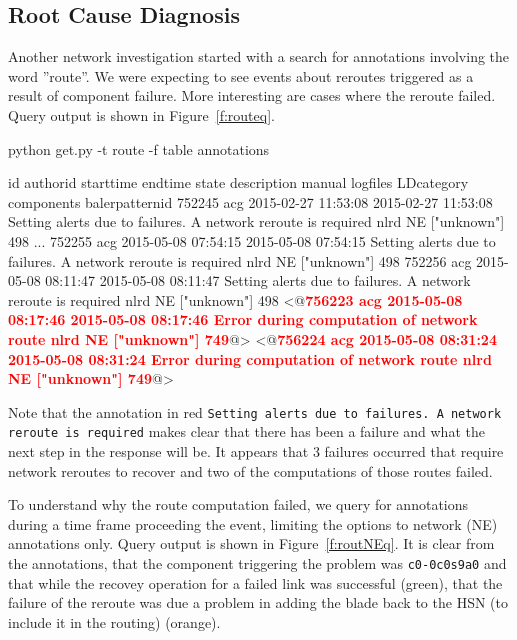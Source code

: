 \subsection{Root Cause Diagnosis}
\label{s:route}
Another network investigation started with a search for annotations involving the word ''route''.
We were expecting to see events about reroutes triggered as a result of component failure. More interesting
are cases where the reroute failed. Query output is shown in Figure~\ref{f:routeq}.

\begin{figure*}
\begin{annol}
python get.py -t route -f table annotations

id	authorid	starttime	endtime	state	description	manual	logfiles LDcategory	components	balerpatternid
752245	acg	2015-02-27 11:53:08	2015-02-27 11:53:08	Setting alerts due to failures. A network reroute is required	nlrd	NE	["unknown"]	498
...
752255	acg	2015-05-08 07:54:15	2015-05-08 07:54:15	Setting alerts due to failures. A network reroute is required	nlrd	NE	["unknown"]	498
752256	acg	2015-05-08 08:11:47	2015-05-08 08:11:47	Setting alerts due to failures. A network reroute is required	nlrd	NE	["unknown"]	498
<@\textbf{\textcolor{red}{756223	acg	2015-05-08 08:17:46	2015-05-08 08:17:46	Error during computation of network route    nlrd	NE	["unknown"]	749}}@>
<@\textbf{\textcolor{red}{756224	acg	2015-05-08 08:31:24	2015-05-08 08:31:24	Error during computation of network route    nlrd	NE	["unknown"]	749}}@>
\end{annol}
\caption{Output of query for route annotations. Complete output = 15 annotations}
\label{f:routeq}
\end{figure*}

Note that the annotation in red \texttt{Setting alerts due to failures. A network reroute is required} makes clear that there has been a failure and what the next step in the response will be. It appears that 3 failures occurred that require network reroutes to recover and two of the computations of those routes failed.

To understand why the route computation failed, we query for annotations during a time frame proceeding the event, limiting the options to network (NE) annotations only.
Query output is shown in Figure~\ref{f:routNEq}. It is clear from the annotations, that the component triggering the problem was \texttt{c0-0c0s9a0} and that
while the recovey operation for a failed link was successful (green), that the
failure of the reroute was due a problem in adding the blade back to the HSN (to include it in the routing) (orange).


